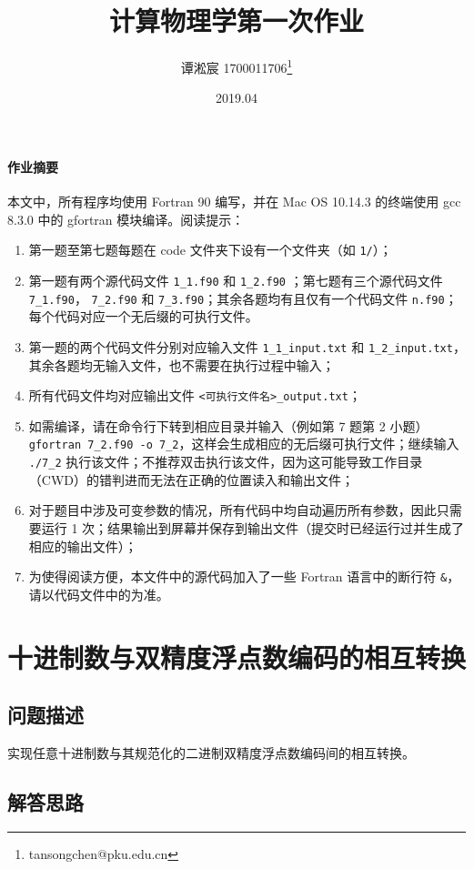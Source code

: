 \documentclass{ctexart}
\begin{document}
\lstset{language=fortran}
\title{计算物理学第一次作业}
\author{谭淞宸 1700011706\thanks{tansongchen@pku.edu.cn}}
\date{2019.04}
\newcommand{\f}{\mathrm{d}}
\maketitle
\paragraph{作业摘要}
本文中，所有程序均使用 Fortran 90 编写，并在 Mac OS 10.14.3 的终端使用 gcc 8.3.0 中的 gfortran 模块编译。阅读提示：
\begin{enumerate}
	\item 第一题至第七题每题在 code 文件夹下设有一个文件夹（如 \verb|1/|）；
	\item 第一题有两个源代码文件 \verb|1_1.f90| 和 \verb|1_2.f90| ；第七题有三个源代码文件 \verb|7_1.f90|， \verb|7_2.f90| 和 \verb|7_3.f90|；其余各题均有且仅有一个代码文件 \verb|n.f90|；每个代码对应一个无后缀的可执行文件。
	\item 第一题的两个代码文件分别对应输入文件 \verb|1_1_input.txt| 和 \verb|1_2_input.txt|，其余各题均无输入文件，也不需要在执行过程中输入；
	\item 所有代码文件均对应输出文件 \verb|<可执行文件名>_output.txt|；
	\item 如需编译，请在命令行下转到相应目录并输入（例如第 7 题第 2 小题） \verb|gfortran 7_2.f90 -o 7_2|，这样会生成相应的无后缀可执行文件；继续输入 \verb|./7_2| 执行该文件；不推荐双击执行该文件，因为这可能导致工作目录（CWD）的错判进而无法在正确的位置读入和输出文件；
	\item 对于题目中涉及可变参数的情况，所有代码中均自动遍历所有参数，因此只需要运行 1 次；结果输出到屏幕并保存到输出文件（提交时已经运行过并生成了相应的输出文件）；
	\item 为使得阅读方便，本文件中的源代码加入了一些 Fortran 语言中的断行符 \verb|&|，请以代码文件中的为准。
\end{enumerate}
\newpage
\section{十进制数与双精度浮点数编码的相互转换}
\subsection{问题描述}
实现任意十进制数与其规范化的二进制双精度浮点数编码间的相互转换。
\subsection{解答思路}
\end{document}
